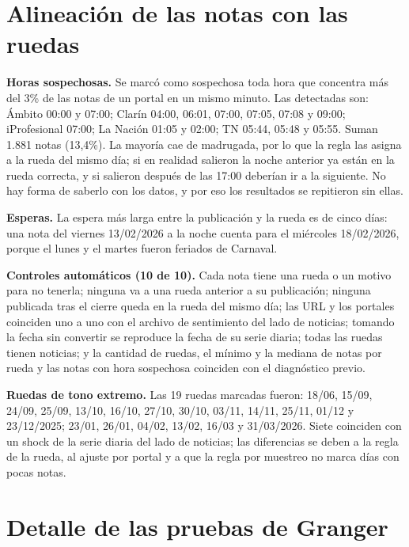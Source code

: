 \chapter{Alineación de las notas con las ruedas}
\label{anx:alineacion}

\textbf{Horas sospechosas.} Se marcó como sospechosa toda hora que concentra más del 3\% de
las notas de un portal en un mismo minuto. Las detectadas son: Ámbito 00:00 y 07:00; Clarín
04:00, 06:01, 07:00, 07:05, 07:08 y 09:00; iProfesional 07:00; La Nación 01:05 y 02:00; TN
05:44, 05:48 y 05:55. Suman 1.881 notas (13,4\%). La mayoría cae de madrugada, por lo que la
regla las asigna a la rueda del mismo día; si en realidad salieron la noche anterior ya están
en la rueda correcta, y si salieron después de las 17:00 deberían ir a la siguiente. No hay
forma de saberlo con los datos, y por eso los resultados se repitieron sin ellas.

\textbf{Esperas.} La espera más larga entre la publicación y la rueda es de cinco días: una nota
del viernes 13/02/2026 a la noche cuenta para el miércoles 18/02/2026, porque el lunes y el
martes fueron feriados de Carnaval.

\textbf{Controles automáticos (10 de 10).} Cada nota tiene una rueda o un motivo para no
tenerla; ninguna va a una rueda anterior a su publicación; ninguna publicada tras el cierre
queda en la rueda del mismo día; las URL y los portales coinciden uno a uno con el archivo de
sentimiento del lado de noticias; tomando la fecha sin convertir se reproduce la fecha de su
serie diaria; todas las ruedas tienen noticias; y la cantidad de ruedas, el mínimo y la mediana
de notas por rueda y las notas con hora sospechosa coinciden con el diagnóstico previo.

\textbf{Ruedas de tono extremo.} Las 19 ruedas marcadas fueron: 18/06, 15/09, 24/09, 25/09,
13/10, 16/10, 27/10, 30/10, 03/11, 14/11, 25/11, 01/12 y 23/12/2025; 23/01, 26/01, 04/02,
13/02, 16/03 y 31/03/2026. Siete coinciden con un shock de la serie diaria del lado de
noticias; las diferencias se deben a la regla de la rueda, al ajuste por portal y a que la
regla por muestreo no marca días con pocas notas.

\chapter{Detalle de las pruebas de Granger}
\label{anx:granger}


